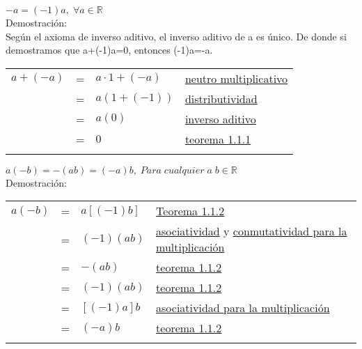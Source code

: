 \begin{teo} $-a=(-1)a, \; \forall a \in \mathbb{R}$\\ \label{teo 1.1.2}
Demostración:\\
Según el axioma de inverso aditivo, el inverso aditivo de a es único. De donde si demostramos que a+(-1)a=0, entonces (-1)a=-a. 
\begin{center}
\begin{tabular}{r c l l}
$a+(-a)$&=&$a\cdot 1+(-a)$&\hyperref[M4]{neutro multiplicativo}\\
&=&$a(1+(-1))$&\hyperref[D]{distributividad}\\
&=&$a(0)$&\hyperref[M5]{inverso aditivo}\\
&=&$0$&\hyperref[teo 1.1.1]{teorema 1.1.1}\\\\
\end{tabular}
\end{center}
\end{teo}

\begin{col.}
$a(-b)=-(ab)=(-a)b, \; Para \; cualquier \; a \; b \in \mathbb{R}$\\ \label{cor 1.1.1}
Demostración:
\begin{center}
\begin{tabular}{r c l l}
$a(-b)$&=&$a\left[(-1)b \right]$&\hyperref[teo 1.1.2]{Teorema 1.1.2}\\
&=&$(-1)(ab)$&\hyperref[M3]{asociatividad} y \hyperref[M2]{conmutatividad para la multiplicación} \\
&=&$-(ab)$&\hyperref[teo 1.1.2]{teorema 1.1.2}\\
&=&$(-1)(ab)$&\hyperref[teo 1.1.2]{teorema 1.1.2}\\
&=&$\left[(-1)a\right]b$&\hyperref[M3]{asociatividad para la multiplicación}\\
&=&$(-a)b$&\hyperref[teo 1.1.2]{teorema 1.1.2}\\\\
\end{tabular}
\end{center}
\end{col.}

